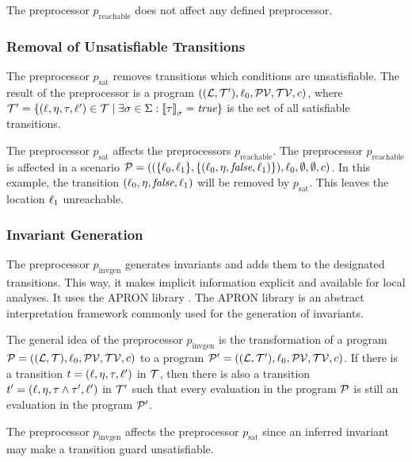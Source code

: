 The preprocessor $p_{\text{reachable}}$ does not affect any defined preprocessor.

\subsubsection{Removal of Unsatisfiable Transitions}

The preprocessor $p_{\text{sat}}$ removes transitions which conditions are unsatisfiable.
The result of the preprocessor is a program $((\mathcal{L}, \mathcal{T}'), \ell_0, \mathcal{PV}, \mathcal{TV}, c)$, where $\mathcal{T}' = \lbrace (\ell,\eta,\tau,\ell') \in \mathcal{T} \mid \exists \sigma \in \Sigma: \left\llbracket \tau \right\rrbracket_{\sigma} = \emph{true} \rbrace$ is the set of all satisfiable transitions.

The preprocessor $p_{\text{sat}}$ affects the preprocessors $p_{\text{reachable}}$.
The preprocessor $p_{\text{reachable}}$ is affected in a scenario $\mathcal{P} = ((\lbrace \ell_0, \ell_1 \rbrace, \lbrace (\ell_0,\eta,\emph{false},\ell_1) \rbrace), \ell_0, \emptyset, \emptyset, c)$.
In this example, the transition $(\ell_0,\eta,\emph{false},\ell_1)$ will be removed by $p_{\text{sat}}$.
This leaves the location $\ell_1$ unreachable.

\subsubsection{Invariant Generation}

The preprocessor $p_{\text{invgen}}$ generates invariants and adds them to the designated transitions.
This way, it makes implicit information explicit and available for local analyses.
It uses the APRON library \cite{apron}.
The APRON library is an abstract interpretation framework commonly used for the generation of invariants.

The general idea of the preprocessor $p_{\text{invgen}}$ is the transformation of a program $\mathcal{P} = ((\mathcal{L}, \mathcal{T}), \ell_0, \mathcal{PV}, \mathcal{TV}, c)$ to a program $\mathcal{P}' = ((\mathcal{L}, \mathcal{T}'), \ell_0, \mathcal{PV}, \mathcal{TV}, c)$.
If there is a transition $t = (\ell, \eta, \tau, \ell')$ in $\mathcal{T}$, then there is also a transition $t' = (\ell, \eta, \tau \wedge \tau', \ell')$ in $\mathcal{T}'$ such that every evaluation in the program $\mathcal{P}$ is still an evaluation in the program $\mathcal{P}'$.

The preprocessor $p_{\text{invgen}}$ affects the preprocessor $p_{\text{sat}}$ since an inferred invariant may make a transition guard unsatisfiable.

